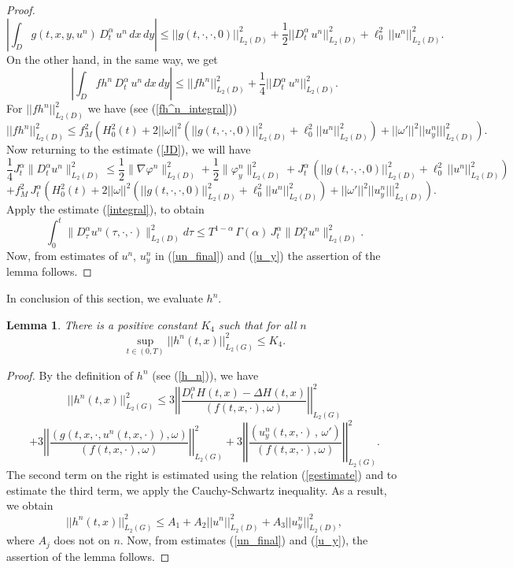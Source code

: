 \documentclass[12pt]{amsart}
\newtheorem{lem}[thm]{Lemma}
\theoremstyle{definition}
\numberwithin{equation}{section}
\begin{document}
\begin{proof}
\[
\left|\int_D g(t,x,y, u^n)\, D_t^\alpha\, u^n\, dx\, dy\right|  \leq  ||g(t, \cdot, \cdot, 0)||_{L_2(D)}^2 + \frac{1}{2} ||D_t^\alpha\,u^n||_{L_2(D)}^2 + \ell^2_0 \,  ||u^n||_{L_2(D)}^2.
\]
On the other hand, in the same way, we get
\begin{equation}\label{fDu^n}
    \left|\int_D f h^n\, D_t^\alpha\,u^n\, dx\, dy\right |\leq  ||f h^n||_{L_2(D)}^2 + \frac{1}{4} ||D_t^\alpha\,u^n||_{L_2(D)}^2.
\end{equation}
For $||f h^n||_{L_2(D)}^2$ we have (see (\ref{fh^n_integral}))
\[
 ||f h^n||_{L_2(D)}^2\leq f_M^2 \left(H_0^2(t)+ 2 ||\omega||^2 (  ||g(t,\cdot, \cdot, 0)||_{L_2(D)}^2 + \ell^2_0 ||u^n ||_{L_2(D)}^2) + ||\omega'||^2 ||u_y^n|||_{L_2(D)}^2\right).
 \]
Now returning to the estimate (\ref{JD}), we will have
\[\frac{1}{4}J_t^\alpha\| D_t^{\alpha} u^n \|^2_{L_2(D)}\leq \frac{1}{2} \| \nabla \varphi^n \|^2_{L_2(D)} + \frac{1}{2} \| \varphi_y^n \|^2_{L_2(D)}+J_t^\alpha\,  \left(||g(t, \cdot, \cdot, 0)||_{L_2(D)}^2 +  \ell^2_0 \,  ||u^n||_{L_2(D)}^2 \right )
\]
\[
+ f_M^2\, J_t^\alpha  \left(H_0^2(t)+ 2 ||\omega||^2 (  ||g(t,\cdot, \cdot, 0)||_{L_2(D)}^2 + \ell^2_0 ||u^n ||_{L_2(D)}^2) + ||\omega'||^2 ||u_y^n|||_{L_2(D)}^2\right).
\]
Apply the estimate   (\ref{integral}), to obtain 
\[
\int_0^t\| D_\tau^{\alpha} u^n (\tau, \cdot, \cdot)\|^2_{L_2(D)}d \tau\leq  T^{1-\alpha}\, \Gamma(\alpha) \, J_t^\alpha\| D_t^{\alpha} u^n \|^2_{L_2(D)}.
\]
Now, from estimates  of $u^n$, $u_y^n$ in (\ref{un_final}) and (\ref{u_y}) the assertion of the lemma follows.
\end{proof}

In conclusion of this section, we evaluate $h^n$. 
\begin{lem}\label{hestimatelemma} There is a positive constant $K_4$ such that for all $n$
\begin{equation}\label{hestimate}
 \sup_{t\in(0, T)} ||h^n(t, x)||_{L_2(G)}^2
    \leq K_4.  
\end{equation}
\end{lem}
\begin{proof}
By the definition of $h^n$ (see (\ref{h_n})), we have
\[
||h^n(t, x)||_{L_2(G)}^2
    \leq  3\left|\left|\frac{D_t^{\alpha} H(t, x) -\Delta H(t, x)}{(f(t, x, \cdot), \omega)}\right|\right|_{L_2(G)}^2
\]
\begin{equation}\label{hestimate2}
    + 3\left|\left|\frac{(g(t, x, \cdot, u^n(t,x, \cdot)), \omega)}{(f(t, x, \cdot), \omega)}\right|\right|_{L_2(G)}^2 + 3\left|\left|\frac{(u^n_y(t,x, \cdot)\, , \, \omega')}{(f(t, x, \cdot), \omega)}\right|\right|_{L_2(G)}^2.
\end{equation}
The second term on the right is estimated using the relation (\ref{gestimate}) and to estimate the third term, we apply the Cauchy-Schwartz inequality. As a result, we obtain
\[
||h^n(t, x)||_{L_2(G)}^2
    \leq A_1 + A_2 ||u^n||_{L_2(D)}^2 + A_3 ||u_y^n||_{L_2(D)}^2,
    \]
where $A_j$ does not on $n$. Now, from estimates (\ref{un_final}) and (\ref{u_y}), the assertion of the lemma follows. \end{proof}
\end{document}
